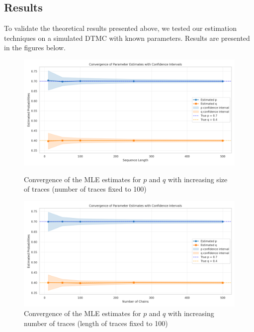 \documentclass[twocolumn, 9pt]{extarticle}
\begin{document}
\subsection{Results}
To validate the theoretical results presented above, we tested our estimation techniques on a simulated DTMC with known parameters. Results are presented in the figures below.
\begin{figure}[h]
\centering
\begin{minipage}[b]{0.48\columnwidth}
  \centering
  \includegraphics[width=\linewidth]{../DTMC/plots/convergence_plot_MLE_sequences.png}
  \caption{\footnotesize{Convergence of the MLE estimates for $p$ and $q$ with increasing size of traces (number of traces fixed to 100)}}
  \label{fig:convergence_plot_MLE_sequences}
\end{minipage}
\hfill
\begin{minipage}[b]{0.48\columnwidth}
  \centering
  \includegraphics[width=\linewidth]{../DTMC/plots/convergence_plot_MLE_chains.png}
  \caption{\footnotesize{Convergence of the MLE estimates for $p$ and $q$ with increasing number of traces (length of traces fixed to 100)}}
  \label{fig:convergence_plot_MLE_chains}
\end{minipage}
\end{figure}
\end{document}
